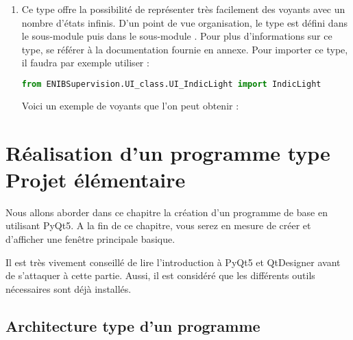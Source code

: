 \documentclass[12pt]{report}    %
\begin{document}
\begin{enumerate}
\newpage

\item {}\newline
Ce type offre la possibilité de représenter très facilement des voyants avec un nombre d'états infinis.\newline
D'un point de vue organisation, le type  est défini dans le sous-module  puis dans le sous-module \newline {}.\newline
Pour plus d'informations sur ce type, se référer à la documentation fournie en annexe.\newline
Pour importer ce type, il faudra par exemple utiliser :
\begin{lstlisting}[language=Python]
from ENIBSupervision.UI_class.UI_IndicLight import IndicLight
\end{lstlisting}
Voici un exemple de voyants que l'on peut obtenir :

\end{enumerate}





\chapter{Réalisation d'un programme type\protect\\Projet élémentaire}

Nous allons aborder dans ce chapitre la création d'un programme de base en utilisant PyQt5. A la fin de ce chapitre, vous serez en mesure de créer et d'afficher une fenêtre principale basique.\smallSkip

Il est très vivement conseillé de lire l'introduction à PyQt5 et QtDesigner avant de s'attaquer à cette partie. Aussi, il est considéré que les différents outils nécessaires sont déjà installés.



\section{Architecture type d'un programme}
\end{document}
